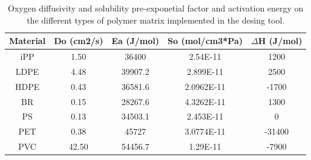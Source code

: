 \begin{refsection}
\begin{table}[H]
\centering
\caption{Oxygen diffusivity and solubility pre-exponetial factor and activation energy on the different types of polymer matrix implemented in the desing tool.}
\label{tab:my-table}

\begin{tabular}{|c|c|c|c|c|}
\hline
Material & Do (cm2/s) & Ea (J/mol) & So (mol/cm3*Pa) & $\Delta$H (J/mol) \\ \hline
iPP      & 1.50       & 36400      & 2.54E-11        & 1200             \\ \hline
LDPE     & 4.48       & 39907.2    & 2.899E-11       & 2500             \\ \hline
HDPE     & 0.43       & 36581.6    & 2.0962E-11      & -1700            \\ \hline
BR       & 0.15       & 28267.6    & 4.3262E-11      & 1300             \\ \hline
PS       & 0.13       & 34503.1    & 2.453E-11       & 0                \\ \hline
PET      & 0.38       & 45727      & 3.0774E-11      & -31400           \\ \hline
PVC      & 42.50      & 54456.7    & 1.29E-11        & -7900            \\ \hline
\end{tabular}%
\end{table}










\printbibliography
\end{refsection}